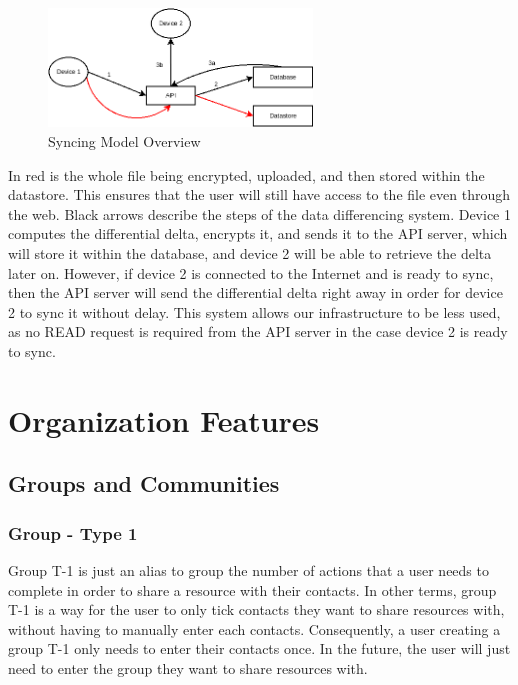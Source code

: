 \documentclass[a4paper,9pt,twoside]{article}
\begin{document}
\begin{figure}[H]
\centering
\includegraphics[width=70mm]{./diagram/differentialdeltaarchitecture.png}
\caption{Syncing Model Overview \label{diffdeltaarchi}}
\end{figure}

In red is the whole file being encrypted, uploaded, and then stored within the datastore. 
This ensures that the user will still have access to the file even through the web. Black arrows 
describe the steps of the data differencing system. Device 1 computes the differential delta, 
encrypts it, and sends it to the API server, which will store it within the database, and device 2 
will be able to retrieve the delta later on. However,  if device 2 is connected to the Internet 
and is ready to sync, then the API server will send the differential delta right away in order 
for device 2 to sync it without delay. This system allows our infrastructure to be less used, as 
no READ request is required from the API server in the case device 2 is ready to sync.

\section{Organization Features}

\subsection{Groups and Communities}

\subsubsection{Group - Type 1}

    Group T-1 is just an alias to group the number of actions that a user needs to 
complete in order to share a resource with their contacts. In other terms, group T-1 
is a way for the user to only tick contacts they want to share resources with, without having 
to manually enter each contacts. Consequently, a user creating a group T-1 only needs to 
enter their contacts once. In the future, the user will just need to enter the group they want 
to share resources with.
\end{document}
